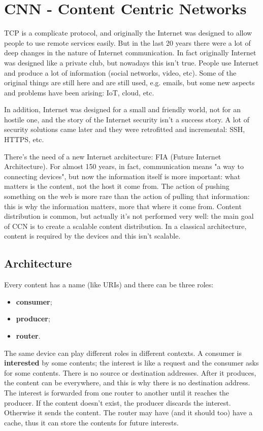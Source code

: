 \chapter{CNN - Content Centric Networks}
TCP is a complicate protocol, and originally the Internet was designed to allow
people to use remote services easily. But in the last 20 years there were a lot
of deep changes in the nature of Internet communication. In fact originally
Internet was designed like a private club, but nowadays this isn't true. People
use Internet and produce a lot of information (social networks, video, etc).
Some of the original things are still here and are still used, e.g. emails, but
some new aspects and problems have been arising: IoT, cloud, etc.

In addition, Internet was designed for a small and friendly world, not for an
hostile one, and the story of the Internet security isn't a success story. A
lot of security solutions came later and they were retrofitted and incremental:
SSH, HTTPS, etc.

There's the need of a new Internet architecture: FIA (Future Internet
Architecture). For almost 150 years, in fact, communication means "a way to
connecting devices", but now the information itself is more important: what
matters is the content, not the host it come from. The action of pushing
something on the web is more rare than the action of pulling that information:
this is why the information matters, more that where it come from. Content
distribution is common, but actually it's not performed very well: the main goal
of CCN is to create a scalable content distribution. In a classical
architecture, content is required by the devices and this isn't scalable.

\section{Architecture}
Every content has a name (like URIs) and there can be three roles:
\begin{itemize}
  \item \textbf{consumer};
  \item \textbf{producer};
  \item \textbf{router}.
\end{itemize}
The same device can play different roles in different contexts. A consumer is
\textbf{interested} by some contents; the interest is like a request and the
consumer asks for some contents. There is no source or destination addresses.
After it produces, the content can be everywhere, and this is why there is
no destination address. The interest is forwarded from one router to another
until it reaches the producer. If the content doesn't exist, the producer
discards the interest. Otherwise it sends the content. The router may have (and
it should too) have a cache, thus it can store the contents for future
interests.


